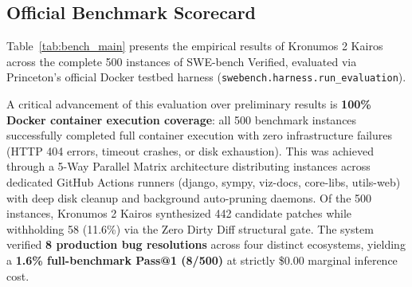 \documentclass[10pt,twocolumn,letterpaper]{article}
\begin{document}
\subsection{Official Benchmark Scorecard}
Table~\ref{tab:bench_main} presents the empirical results of Kronumos 2 Kairos across the complete 500 instances of SWE-bench Verified, evaluated via Princeton's official Docker testbed harness (\texttt{swebench.harness.run\_evaluation}).

A critical advancement of this evaluation over preliminary results is \textbf{100\% Docker container execution coverage}: all 500 benchmark instances successfully completed full container execution with zero infrastructure failures (HTTP 404 errors, timeout crashes, or disk exhaustion). This was achieved through a 5-Way Parallel Matrix architecture distributing instances across dedicated GitHub Actions runners (django, sympy, viz-docs, core-libs, utils-web) with deep disk cleanup and background auto-pruning daemons. Of the 500 instances, Kronumos 2 Kairos synthesized 442 candidate patches while withholding 58 (11.6\%) via the Zero Dirty Diff structural gate. The system verified \textbf{8 production bug resolutions} across four distinct ecosystems, yielding a \textbf{1.6\% full-benchmark Pass@1 (8/500)} at strictly \$0.00 marginal inference cost.

\begin{table}[htbp]
\centering
\small
\caption{Empirical results on SWE-bench Verified ($N=500$). Kronumos 2 Kairos v2 with full container coverage.}
\label{tab:bench_main}
\end{table}
\end{document}
